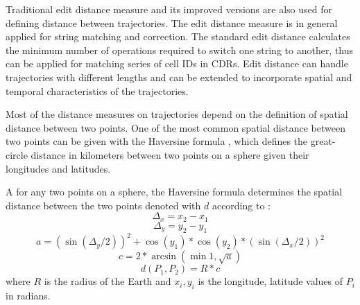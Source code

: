 Traditional edit distance measure and its improved versions are also used for defining distance between trajectories. 
The edit distance measure is in general applied for string matching and correction. The standard edit distance calculates the minimum number of operations required to switch one string to another, thus can be applied for matching series of cell IDs in CDRs. Edit distance can handle trajectories with different lengths and can be extended to incorporate spatial and temporal characteristics of the trajectories. \cite{spatial_edit}

Most of the distance measures on trajectories depend on the definition of spatial distance between two points. One of the most common spatial distance between two points can be given with the Haversine formula \cite{haversine}, which  defines the great-circle distance in kilometers between two points on a sphere given their longitudes and latitudes.

\begin{definition}
A for any two points on a sphere, the Haversine formula determines the spatial distance between the two points denoted with $d$ according to \cite{haversine}:
    \[\Delta_{x} = x_{2} - x_{1}\]
    \[\Delta_{y} = y_{2} - y_{1}\]
    \[a = (\sin(\Delta_{y}/2))^2 + \cos{(y_{1})} * \cos{(y_{2})} * (\sin{(\Delta_{x}/2)})^2 \]
    \[c = 2 * \arcsin{(\min{1,\sqrt{a}})}\]
    \[d(P_{1}, P_{2}) = R * c\]
    where $R$ is the radius of the Earth and $x_{i}, y_{i}$ is the longitude, latitude values of $P_{i}$ in radians.
\end{definition}

